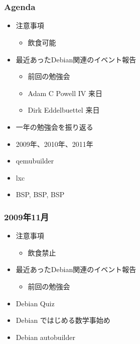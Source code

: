 \frame{\titlepage{}}


\section{}
\begin{frame}
 \frametitle{Agenda}
\begin{minipage}[t]{0.45\hsize}
  \begin{itemize}
  \item 注意事項
	\begin{itemize}
	 \item 飲食可能
	\end{itemize}
  \item 最近あったDebian関連のイベント報告
	\begin{itemize}
	 \item 前回の勉強会
	 \item Adam C Powell IV 来日
	 \item Dirk Eddelbuettel 来日
	\end{itemize}
 \end{itemize}
\end{minipage} 
\begin{minipage}[t]{0.45\hsize}
 \begin{itemize}
  \item 一年の勉強会を振り返る
  \item 2009年、2010年、2011年
  \item qemubuilder
  \item lxc
  \item BSP, BSP, BSP
 \end{itemize}
\end{minipage}
\end{frame}


\begin{frame}
 \frametitle{2009年11月}
\begin{minipage}[t]{0.45\hsize}
  \begin{itemize}
  \item 注意事項
	\begin{itemize}
	 \item 飲食禁止
	\end{itemize}
  \item 最近あったDebian関連のイベント報告
	\begin{itemize}
	 \item 前回の勉強会
	\end{itemize}
 \end{itemize}
\end{minipage} 
\begin{minipage}[t]{0.45\hsize}
 \begin{itemize}
  \item Debian Quiz
  \item Debian ではじめる数学事始め
  \item Debian autobuilder
 \end{itemize}
\end{minipage}
\end{frame}

